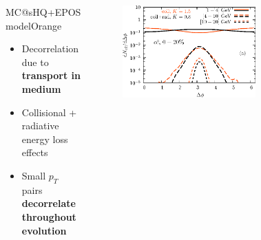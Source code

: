 \documentclass[aspectratio=169,11pt,usenames,dvipsnames]{beamer}
\begin{document}
\begin{frame}[noframenumbering]
{\begin{center}
\begin{columns}[onlytextwidth,t]
\begin{figure}
            \end{figure}
            \begin{center}
                \begin{custombox2transp}{\normalsize{} MC@sHQ+EPOS model}{Orange}
                    \small
                    \begin{varwidth}{1.06\textwidth}
                    \begin{itemize}\itemsep0em 
                        \itemsep0em
                        \footnotesize
                        \item{} Decorrelation due to {\bfseries\color{Orange}transport in medium}
                        \item{} Collisional + radiative energy loss effects
                        \item{} Small $p_T$ pairs {\bfseries\color{Orange}decorrelate throughout evolution}
                    \end{itemize}
                    \end{varwidth}
                \end{custombox2transp}
            \end{center}
            \vspace{-10pt}
            \begin{figure}
                \centering
                \includegraphics[width=0.83\columnwidth]{images/deltaphi_cccor_centrala.eps}
            \end{figure}
        \end{columns}    
    \end{center}}


\end{frame}
\end{document}
